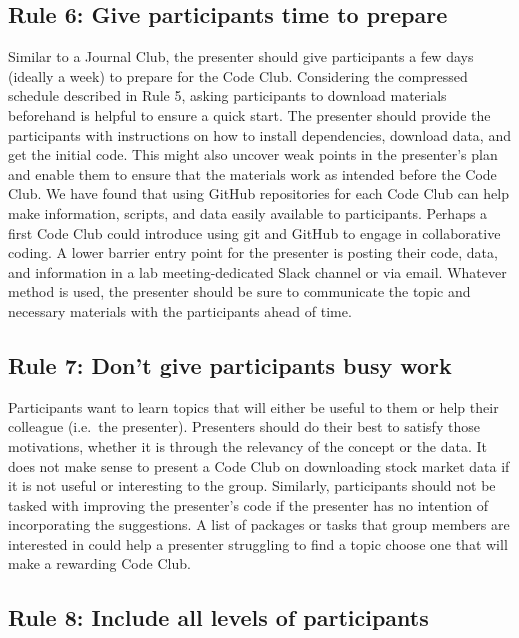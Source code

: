 \documentclass[
  11pt,
]{article}
\begin{document}
\hypertarget{rule-6-give-participants-time-to-prepare}{%
\subsection{Rule 6: Give participants time to
prepare}\label{rule-6-give-participants-time-to-prepare}}

Similar to a Journal Club, the presenter should give participants a few
days (ideally a week) to prepare for the Code Club. Considering the
compressed schedule described in Rule 5, asking participants to download
materials beforehand is helpful to ensure a quick start. The presenter
should provide the participants with instructions on how to install
dependencies, download data, and get the initial code. This might also
uncover weak points in the presenter's plan and enable them to ensure
that the materials work as intended before the Code Club. We have found
that using GitHub repositories for each Code Club can help make
information, scripts, and data easily available to participants. Perhaps
a first Code Club could introduce using git and GitHub to engage in
collaborative coding. A lower barrier entry point for the presenter is
posting their code, data, and information in a lab meeting-dedicated
Slack channel or via email. Whatever method is used, the presenter
should be sure to communicate the topic and necessary materials with the
participants ahead of time.

\hypertarget{rule-7-dont-give-participants-busy-work}{%
\subsection{Rule 7: Don't give participants busy
work}\label{rule-7-dont-give-participants-busy-work}}

Participants want to learn topics that will either be useful to them or
help their colleague (i.e.~the presenter). Presenters should do their
best to satisfy those motivations, whether it is through the relevancy
of the concept or the data. It does not make sense to present a Code
Club on downloading stock market data if it is not useful or interesting
to the group. Similarly, participants should not be tasked with
improving the presenter's code if the presenter has no intention of
incorporating the suggestions. A list of packages or tasks that group
members are interested in could help a presenter struggling to find a
topic choose one that will make a rewarding Code Club.

\hypertarget{rule-8-include-all-levels-of-participants}{%
\subsection{Rule 8: Include all levels of
participants}\label{rule-8-include-all-levels-of-participants}}
\end{document}
